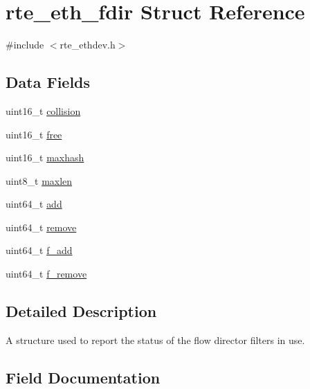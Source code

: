 \hypertarget{structrte__eth__fdir}{}\section{rte\+\_\+eth\+\_\+fdir Struct Reference}
\label{structrte__eth__fdir}


{\ttfamily \#include $<$rte\+\_\+ethdev.\+h$>$}

\subsection*{Data Fields}
\begin{DoxyCompactItemize}
\item 
uint16\+\_\+t \hyperlink{structrte__eth__fdir_a25acdd048286f86d35913474e7f0f41a}{collision}
\item 
uint16\+\_\+t \hyperlink{structrte__eth__fdir_a726dbe40127a1f14bf8e72ab94453698}{free}
\item 
uint16\+\_\+t \hyperlink{structrte__eth__fdir_a4831f0a60028910696c19abb4cd2c93c}{maxhash}
\item 
uint8\+\_\+t \hyperlink{structrte__eth__fdir_a3e3c2f17b215a23942df0e2bb527e84b}{maxlen}
\item 
uint64\+\_\+t \hyperlink{structrte__eth__fdir_ac36885456d6bcecbaa4c398f13f40608}{add}
\item 
uint64\+\_\+t \hyperlink{structrte__eth__fdir_ae76c413e5f774d65cf4c01b1dc587202}{remove}
\item 
uint64\+\_\+t \hyperlink{structrte__eth__fdir_ac31d973a80c54b421052347487624a9d}{f\+\_\+add}
\item 
uint64\+\_\+t \hyperlink{structrte__eth__fdir_ad6019034f869934701c2518978e7be0c}{f\+\_\+remove}
\end{DoxyCompactItemize}


\subsection{Detailed Description}
A structure used to report the status of the flow director filters in use. 

\subsection{Field Documentation}
\hypertarget{structrte__eth__fdir_ac36885456d6bcecbaa4c398f13f40608}{}
